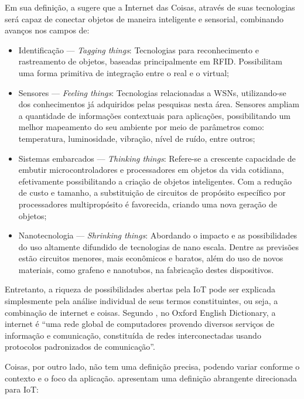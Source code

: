 \documentclass[twoside,english,brazilian]{UNISINOSmonografia}
\begin{document}
	Em sua definição, a  sugere que a Internet das 
	Coisas, através de suas tecnologias será capaz de conectar objetos de 
	maneira inteligente e sensorial, combinando avanços nos campos de:
	\begin{itemize}
		\item Identificação --- \textit{Tagging things}: Tecnologias para 
		reconhecimento e rastreamento de objetos, baseadas principalmente 
		em RFID. Possibilitam uma forma primitiva de integração entre o 
		real e o virtual;
		
		\item Sensores --- \textit{Feeling things}: Tecnologias 
		relacionadas a WSNs, utilizando-se dos conhecimentos já adquiridos 
		pelas pesquisas nesta área. Sensores ampliam a quantidade de 
		informações contextuais para aplicações, possibilitando um melhor 
		mapeamento do seu ambiente por meio de parâmetros como: 
		temperatura, luminosidade, vibração, nível de ruído, entre outros;
		
		\item Sistemas embarcados --- \textit{Thinking things}: Refere-se 
		a crescente capacidade de embutir microcontroladores e 	
		processadores em objetos da vida cotidiana, efetivamente 
		possibilitando a criação de objetos inteligentes. Com a redução de 
		custo e tamanho, a substituição de circuitos de propósito 
		específico por processadores multipropósito é favorecida, criando 
		uma nova geração de objetos;
		
		\item Nanotecnologia --- \textit{Shrinking things}: Abordando o 
		impacto e as possibilidades do uso altamente difundido de 
		tecnologias de nano escala. Dentre as previsões estão circuitos 
		menores, mais econômicos e baratos, além do uso de novos 
		materiais, como grafeno e nanotubos, na fabricação destes 
		dispositivos.
	\end{itemize}
	
	Entretanto, a riqueza de possibilidades abertas pela IoT pode ser 
	explicada simplesmente pela análise individual de seus termos 
	constituintes, ou seja, a combinação de internet e coisas. Segundo 
	, no Oxford English Dictionary, a internet é 
	``uma rede global de computadores provendo diversos serviços de 
	informação e comunicação, constituída de redes interconectadas usando 
	protocolos padronizados de comunicação''.
	
	Coisas, por outro lado, não tem uma definição precisa, podendo variar 
	conforme o contexto e o foco da aplicação.  
	apresentam uma definição abrangente direcionada para IoT:
	
\end{document}
